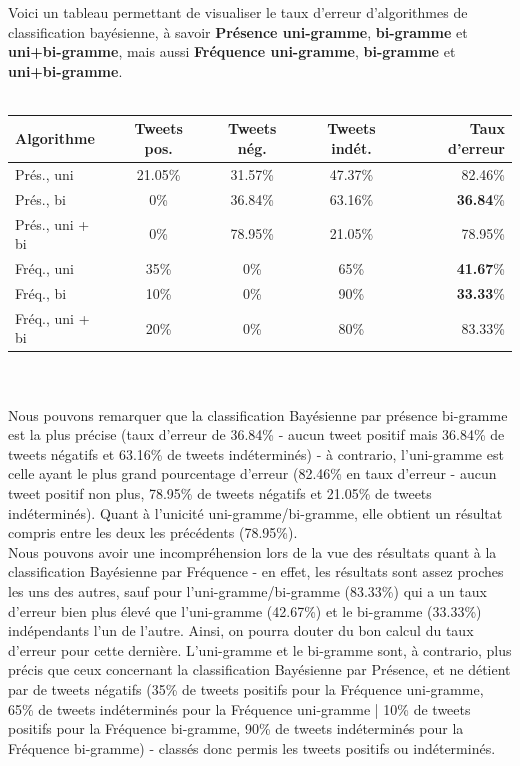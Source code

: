 \documentclass[pdftex,12pt,a4paper]{report}
\begin{document}
\begin{spacing}{1.2}
Voici un tableau permettant de visualiser le taux d'erreur d'algorithmes de classification bayésienne, à savoir \textbf{Présence uni-gramme}, \textbf{bi-gramme} et \textbf{uni+bi-gramme}, mais aussi \textbf{Fréquence uni-gramme}, \textbf{bi-gramme} et \textbf{uni+bi-gramme}.
\\
\\
\begin{tabular}{|l|c|c|c|r|}
  \hline
  \textbf{Algorithme} & \textbf{Tweets pos.} & \textbf{Tweets nég.} & \textbf{Tweets indét.} & \textbf{Taux d'erreur}\\
  \hline
  Prés., uni & 21.05\% & 31.57\% & 47.37\% & 82.46\%\\
  Prés., bi & 0\% & 36.84\% & 63.16\% & \textbf{36.84}\% \\
  Prés., uni + bi & 0\% & 78.95\% & 21.05\% & 78.95\% \\
  Fréq., uni & 35\% & 0\% & 65\% & \textbf{41.67}\% \\
  Fréq., bi & 10\% & 0\% & 90\% & \textbf{33.33}\% \\
  Fréq., uni + bi & 20\% & 0\% & 80\% & 83.33\% \\
  \hline
\end{tabular}
\\
\\
Nous pouvons remarquer que la classification Bayésienne par présence bi-gramme est la plus précise (taux d'erreur de 36.84\% - aucun tweet positif mais 36.84\% de tweets négatifs et 63.16\% de tweets indéterminés) - à contrario, l'uni-gramme est celle ayant le plus grand pourcentage d'erreur (82.46\% en taux d'erreur - aucun tweet positif non plus, 78.95\% de tweets négatifs et 21.05\% de tweets indéterminés). Quant à l'unicité uni-gramme/bi-gramme, elle obtient un résultat compris entre les deux les précédents (78.95\%).
\\
Nous pouvons avoir une incompréhension lors de la vue des résultats quant à la classification Bayésienne par Fréquence - en effet, les résultats sont assez proches les uns des autres, sauf pour l'uni-gramme/bi-gramme (83.33\%) qui a un taux d'erreur bien plus élevé que l'uni-gramme (42.67\%) et le bi-gramme (33.33\%) indépendants l'un de l'autre. Ainsi, on pourra douter du bon calcul du taux d'erreur pour cette dernière. L'uni-gramme et le bi-gramme sont, à contrario, plus précis que ceux concernant la classification Bayésienne par Présence, et ne détient par de tweets négatifs (35\% de tweets positifs pour la Fréquence uni-gramme, 65\% de tweets indéterminés pour la Fréquence uni-gramme | 10\% de tweets positifs pour la Fréquence bi-gramme, 90\% de tweets indéterminés pour la Fréquence bi-gramme) - classés donc permis les tweets positifs ou indéterminés.


\end{spacing}
\end{document}
